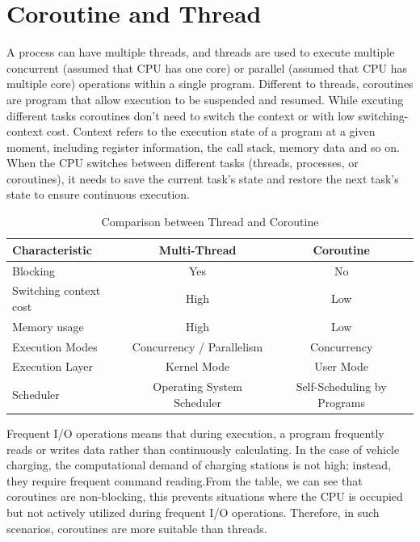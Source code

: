 \documentclass[
english,
ruledheaders=section,%
class=report,%
thesis={type=Report},%
accentcolor=9c,%
custommargins=true,%
marginpar=false,%
parskip=half-,%
fontsize=11pt,%
logofile={img/tuda_logo.pdf}, %
]{tudapub}
\begin{document}
    \section{Coroutine and Thread}
    \label{sec:CoroutineThreadIntroduction}

    A process can have multiple threads, and threads are used to execute multiple concurrent (assumed that CPU has one core) or parallel (assumed that CPU has multiple core) operations within a single program. Different to threads, coroutines are program that allow execution to be suspended and resumed. While excuting different tasks coroutines don't need to switch the context or with low switching-context cost. Context refers to the execution state of a program at a given moment, including register information, the call stack, memory data and so on. When the CPU switches between different tasks (threads, processes, or coroutines), it needs to save the current task's state and restore the next task's state to ensure continuous execution.\cite{coroutinewiki}

    \begin{table}[htbp]
        \centering
        \label{tab:threadandcoroutine}
        \begin{tabular}{|l|c|c|}
            \hline
            \textbf{Characteristic} & \textbf{Multi-Thread} & \textbf{Coroutine}\\
            \hline
            Blocking                & Yes & No\\
            \hline
            Switching context cost  & High & Low\\
            \hline
            Memory usage            & High & Low\\
            \hline
            Execution Modes         & Concurrency / Parallelism & Concurrency\\
            \hline
            Execution Layer         & Kernel Mode & User Mode\\
            \hline
            Scheduler               & Operating System Scheduler & Self-Scheduling by Programs\\
            \hline
        \end{tabular}
        \caption{Comparison between Thread and Coroutine}
    \end{table}


    Frequent I/O operations means that during execution, a program frequently reads or writes data rather than continuously calculating. In the case of vehicle charging, the computational demand of charging stations is not high; instead, they require frequent command reading.From the table, we can see that coroutines are non-blocking, this prevents situations where the CPU is occupied but not actively utilized during frequent I/O operations. \cite{threadcoroutine}Therefore, in such scenarios, coroutines are more suitable than threads.
\end{document}
